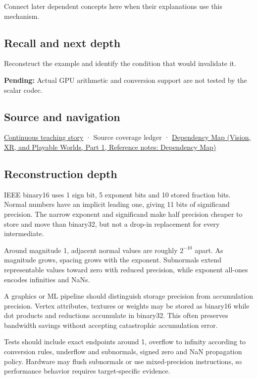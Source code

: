 Connect later dependent concepts here when their explanations use this mechanism.

\subsection{Recall and next depth}\label{appendix-34443cec7170-recall-and-next-depth}

\hypertarget{appendix-34443cec7170-recall-and-next-depth}{}

Reconstruct the example and identify the condition that would invalidate it.

\textbf{Pending:} Actual GPU arithmetic and conversion support are not tested by the scalar codec.

\subsection{Source and navigation}\label{appendix-34443cec7170-source-and-navigation}

\hypertarget{appendix-34443cec7170-source-and-navigation}{}

\hyperref[01-foundations-i-ch001-choosing-what-information-to-keep]{Continuous teaching story} · {Source coverage ledger} · \href{../07-Vision-XR-and-Playable-Worlds-P01/main.pdf\#appendix-4ad47bdd269a}{Dependency Map (Vision, XR, and Playable Worlds, Part 1, Reference notes: Dependency Map)}

\subsection{Reconstruction depth}\label{appendix-34443cec7170-reconstruction-depth}

\hypertarget{appendix-34443cec7170-reconstruction-depth}{}

IEEE binary16 uses 1 sign bit, 5 exponent bits and 10 stored fraction bits. Normal numbers have an implicit leading one, giving 11 bits of significand precision. The narrow exponent and significand make half precision cheaper to store and move than binary32, but not a drop-in replacement for every intermediate.

Around magnitude 1, adjacent normal values are roughly \(2^{-10}\) apart. As magnitude grows, spacing grows with the exponent. Subnormals extend representable values toward zero with reduced precision, while exponent all-ones encodes infinities and NaNs.

A graphics or ML pipeline should distinguish storage precision from accumulation precision. Vertex attributes, textures or weights may be stored as binary16 while dot products and reductions accumulate in binary32. This often preserves bandwidth savings without accepting catastrophic accumulation error.

Tests should include exact endpoints around 1, overflow to infinity according to conversion rules, underflow and subnormals, signed zero and NaN propagation policy. Hardware may flush subnormals or use mixed-precision instructions, so performance behavior requires target-specific evidence.
